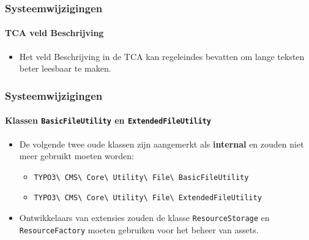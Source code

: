 
\begin{frame}[fragile]
	\frametitle{Systeemwijzigingen}
	\framesubtitle{TCA veld Beschrijving}

	\begin{itemize}
		\item Het veld Beschrijving in de TCA kan regeleindes bevatten om lange teksten beter leesbaar te maken.
	\end{itemize}

\end{frame}


\begin{frame}[fragile]
	\frametitle{Systeemwijzigingen}
	\framesubtitle{Klassen \texttt{BasicFileUtility} en \texttt{ExtendedFileUtility}}

	\begin{itemize}
		\item De volgende twee oude klassen zijn aangemerkt als \textbf{internal}
			en zouden niet meer gebruikt moeten worden:

			\begin{itemize}\small
				\item \texttt{TYPO3\textbackslash
					CMS\textbackslash
					Core\textbackslash
					Utility\textbackslash
					File\textbackslash
					BasicFileUtility}
				\item \texttt{TYPO3\textbackslash
					CMS\textbackslash
					Core\textbackslash
					Utility\textbackslash
					File\textbackslash
					ExtendedFileUtility}
			\end{itemize}

		\item Ontwikkelaars van extensies zouden de klasse \texttt{ResourceStorage}
			en \texttt{ResourceFactory} moeten gebruiken voor het beheer van assets.

	\end{itemize}

\end{frame}


